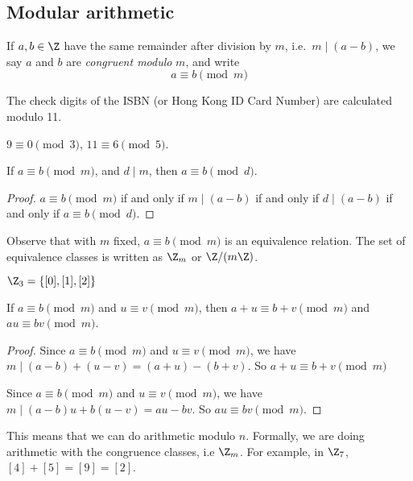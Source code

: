 \documentclass[a4paper]{article}
\begin{document}
\subsection{Modular arithmetic}
\begin{defi}[Modulo]
  If $a, b\in \Z$ have the same remainder after division by $m$, i.e.\ $m \mid (a - b)$, we say $a$ and $b$ are \emph{congruent modulo} $m$, and write
  \[
    a\equiv b\pmod m
  \]
\end{defi}

\begin{eg}
  The check digits of the ISBN (or Hong Kong ID Card Number) are calculated modulo 11.
\end{eg}

\begin{eg}
  $9 \equiv 0\pmod 3$, $11\equiv 6\pmod 5$.
\end{eg}

\begin{prop}
  If $a\equiv b\pmod m$, and $d \mid m$, then $a \equiv b\pmod d$.
\end{prop}

\begin{proof}
  $a\equiv b\pmod m$ if and only if $m \mid (a - b)$ if and only if $d \mid (a - b)$ if and only if $a \equiv b\pmod d$.
\end{proof}

Observe that with $m$ fixed, $a\equiv b\pmod m$ is an equivalence relation. The set of equivalence classes is written as $\Z_m$ or $\Z/(m\Z)$.

\begin{eg}
  $\Z_3 = \{[0], [1], [2]\}$
\end{eg}

\begin{prop}
  If $a\equiv b\pmod m$ and $u\equiv v \pmod m$, then $a + u\equiv b + v\pmod m$ and $au \equiv bv \pmod m$.
\end{prop}

\begin{proof}
  Since $a\equiv b\pmod m$ and $u\equiv v \pmod m$, we have $m \mid (a - b) + (u - v) = (a + u) - (b + v)$. So $a + u\equiv b + v\pmod m$

  Since $a\equiv b\pmod m$ and $u\equiv v \pmod m$, we have $m \mid (a - b)u + b(u - v) = au - bv$. So $au \equiv bv \pmod m$.
\end{proof}

This means that we can do arithmetic modulo $n$. Formally, we are doing arithmetic with the congruence classes, i.e $\Z_m$. For example, in $\Z_7$, $[4] + [5] = [9] = [2]$.
\end{document}
